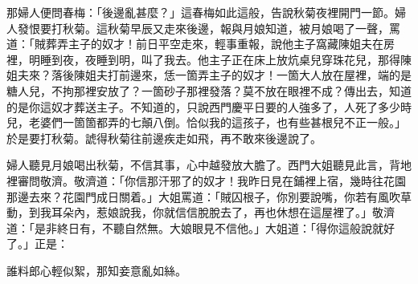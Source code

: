 那婦人便問春梅：「後邊亂甚麼？」這春梅如此這般，告說秋菊夜裡開門一節。婦人發恨要打秋菊。這秋菊早辰又走來後邊，報與月娘知道，被月娘喝了一聲，罵道：「賊葬弄主子的奴才！前日平空走來，輕事重報，說他主子窩藏陳姐夫在房裡，明睡到夜，夜睡到明，叫了我去。他主子正在床上放炕桌兒穿珠花兒，那得陳姐夫來？落後陳姐夫打前邊來，恁一箇弄主子的奴才！一箇大人放在屋裡，端的是糖人兒，不拘那裡安放了？一箇砂子那裡發落？莫不放在眼裡不成？傳出去，知道的是你這奴才葬送主子。不知道的，只說西門慶平日要的人強多了，人死了多少時兒，老婆們一箇箇都弄的七顛八倒。恰似我的這孩子，也有些甚根兒不正一般。」{}於是要打秋菊。諕得秋菊往前邊疾走如飛，再不敢來後邊說了。

婦人聽見月娘喝出秋菊，不信其事，心中越發放大膽了。{}西門大姐聽見此言，背地裡審問敬濟。敬濟道：「你信那汗邪了的奴才！我昨日見在鋪裡上宿，幾時往花園那邊去來？花園門成日關着。」大姐罵道：「賊囚根子，你別要說嘴，你若有風吹草動，到我耳朵內，惹娘說我，你就信信脫脫去了，再也休想在這屋裡了。」敬濟道：「是非終日有，不聽自然無。大娘眼見不信他。」{}大姐道：「得你這般說就好了。」正是：

\begin{myquote}
誰料郎心輕似絮，那知妾意亂如絲。
\end{myquote}

